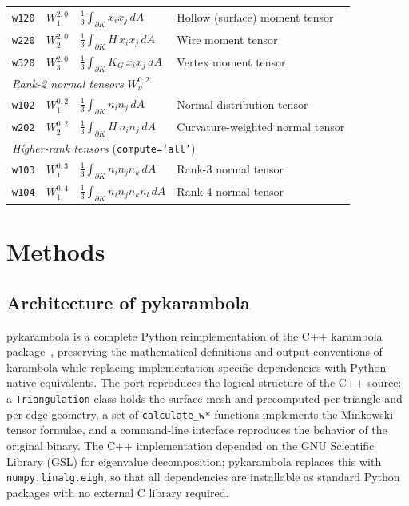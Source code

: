 \documentclass[unnumsec,webpdf,contemporary,large,namedate]{oup-authoring-template}
\begin{document}
\begin{table}[!ht]
\begin{tabular}{llll}
\texttt{w120} & $W_1^{2,0}$ & $\tfrac{1}{3}\int_{\partial K} x_i x_j\,dA$ & Hollow (surface) moment tensor \\
\texttt{w220} & $W_2^{2,0}$ & $\tfrac{1}{3}\int_{\partial K} H\,x_i x_j\,dA$ & Wire moment tensor \\
\texttt{w320} & $W_3^{2,0}$ & $\tfrac{1}{3}\int_{\partial K} K_G\,x_i x_j\,dA$ & Vertex moment tensor \\
\hline
\multicolumn{4}{l}{\textit{Rank-2 normal tensors} $W_\nu^{0,2}$} \\
\texttt{w102} & $W_1^{0,2}$ & $\tfrac{1}{3}\int_{\partial K} n_i n_j\,dA$ & Normal distribution tensor \\
\texttt{w202} & $W_2^{0,2}$ & $\tfrac{1}{3}\int_{\partial K} H\,n_i n_j\,dA$ & Curvature-weighted normal tensor \\
\hline
\multicolumn{4}{l}{\textit{Higher-rank tensors} (\texttt{compute=`all'})} \\
\texttt{w103} & $W_1^{0,3}$ & $\tfrac{1}{3}\int_{\partial K} n_i n_j n_k\,dA$ & Rank-3 normal tensor \\
\texttt{w104} & $W_1^{0,4}$ & $\tfrac{1}{3}\int_{\partial K} n_i n_j n_k n_l\,dA$ & Rank-4 normal tensor \\
\hline
\end{tabular}
\end{table}

\section{Methods}

\subsection{Architecture of pykarambola}
pykarambola is a complete Python reimplementation of the C++ karambola package~\citep{Schaller2020karambola}, preserving the mathematical definitions and output conventions of karambola while replacing implementation-specific dependencies with Python-native equivalents.
The port reproduces the logical structure of the C++ source: a \texttt{Triangulation} class holds the surface mesh and precomputed per-triangle and per-edge geometry, a set of \texttt{calculate\_w*} functions implements the Minkowski tensor formulae, and a command-line interface reproduces the behavior of the original binary.
The C++ implementation depended on the GNU Scientific Library (GSL) for eigenvalue decomposition; pykarambola replaces this with \texttt{numpy.linalg.eigh}, so that all dependencies are installable as standard Python packages with no external C library required.
\end{document}
